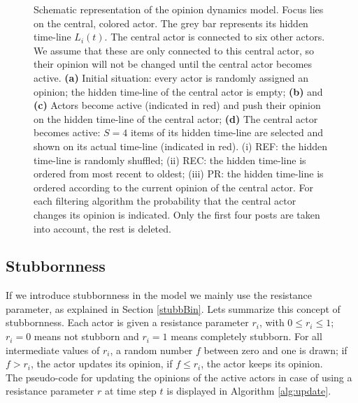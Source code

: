\documentclass[11 pt , letterpaper , twoside , openright]{book}
\begin{document}
\begin{figure}[H]
  \caption[Schematic representation of the opinion dynamics model.]{Schematic representation of the opinion dynamics model. Focus lies on the central, colored actor. The grey bar represents its hidden time-line $L_i(t)$. The central actor is connected to six other actors. We assume that these are only connected to this central actor, so their opinion will not be changed until the central actor becomes active. \textbf{(a)} Initial situation: every actor is randomly assigned an opinion; the hidden time-line of the central actor is empty; \textbf{(b)} and \textbf{(c)} Actors become active (indicated in red) and push their opinion on the hidden time-line of the central actor; \textbf{(d)} The central actor becomes active: $S = 4$ items of its hidden time-line are selected and shown on its actual time-line (indicated in red). (i) REF: the hidden time-line is randomly shuffled; (ii) REC: the hidden time-line is ordered from most recent to oldest; (iii) PR: the hidden time-line is ordered according to the current opinion of the central actor. For each filtering algorithm the probability that the central actor changes its opinion is indicated. Only the first four posts are taken into account, the rest is deleted.}
\label{op_dyn_schem}
\end{figure}

\subsection{Stubbornness}

If we introduce stubbornness in the model we mainly use the resistance parameter, as explained in Section \ref{stubbBin}. Lets summarize this concept of stubbornness. Each actor is given a resistance parameter $r_i$, with $0 \leqslant r_i \leqslant 1$; $r_i = 0$ means not stubborn and $r_i = 1$ means completely stubborn. For all intermediate values of $r_i$, a random number $f$ between zero and one is drawn; if $f > r_i$, the actor updates its opinion, if $f \leqslant r_i$, the actor keeps its opinion. \\
\newline
The pseudo-code for updating the opinions of the active actors in case of using a resistance parameter $r$ at time step $t$ is displayed in Algorithm \ref{alg:update}.
\end{document}
